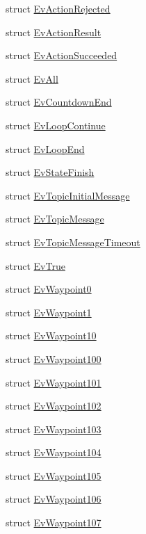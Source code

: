\begin{DoxyCompactItemize}
\item 
struct \hyperlink{structsmacc_1_1EvActionRejected}{Ev\+Action\+Rejected}
\item 
struct \hyperlink{structsmacc_1_1EvActionResult}{Ev\+Action\+Result}
\item 
struct \hyperlink{structsmacc_1_1EvActionSucceeded}{Ev\+Action\+Succeeded}
\item 
struct \hyperlink{structsmacc_1_1EvAll}{Ev\+All}
\item 
struct \hyperlink{structsmacc_1_1EvCountdownEnd}{Ev\+Countdown\+End}
\item 
struct \hyperlink{structsmacc_1_1EvLoopContinue}{Ev\+Loop\+Continue}
\item 
struct \hyperlink{structsmacc_1_1EvLoopEnd}{Ev\+Loop\+End}
\item 
struct \hyperlink{structsmacc_1_1EvStateFinish}{Ev\+State\+Finish}
\item 
struct \hyperlink{structsmacc_1_1EvTopicInitialMessage}{Ev\+Topic\+Initial\+Message}
\item 
struct \hyperlink{structsmacc_1_1EvTopicMessage}{Ev\+Topic\+Message}
\item 
struct \hyperlink{structsmacc_1_1EvTopicMessageTimeout}{Ev\+Topic\+Message\+Timeout}
\item 
struct \hyperlink{structsmacc_1_1EvTrue}{Ev\+True}
\item 
struct \hyperlink{structsmacc_1_1EvWaypoint0}{Ev\+Waypoint0}
\item 
struct \hyperlink{structsmacc_1_1EvWaypoint1}{Ev\+Waypoint1}
\item 
struct \hyperlink{structsmacc_1_1EvWaypoint10}{Ev\+Waypoint10}
\item 
struct \hyperlink{structsmacc_1_1EvWaypoint100}{Ev\+Waypoint100}
\item 
struct \hyperlink{structsmacc_1_1EvWaypoint101}{Ev\+Waypoint101}
\item 
struct \hyperlink{structsmacc_1_1EvWaypoint102}{Ev\+Waypoint102}
\item 
struct \hyperlink{structsmacc_1_1EvWaypoint103}{Ev\+Waypoint103}
\item 
struct \hyperlink{structsmacc_1_1EvWaypoint104}{Ev\+Waypoint104}
\item 
struct \hyperlink{structsmacc_1_1EvWaypoint105}{Ev\+Waypoint105}
\item 
struct \hyperlink{structsmacc_1_1EvWaypoint106}{Ev\+Waypoint106}
\item 
struct \hyperlink{structsmacc_1_1EvWaypoint107}{Ev\+Waypoint107}

\end{DoxyCompactItemize}
